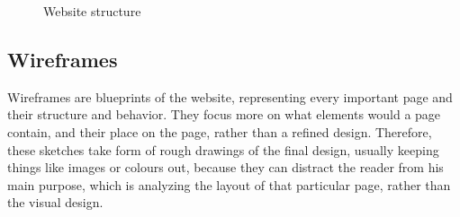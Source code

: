 \documentclass{l3proj}
\begin{document}
\begin{figure}
\begin{center}
		\qquad

	\end{center}
	\label{fig:website-structure}
	\caption{Website structure}
\end{figure}

\subsection{Wireframes}
% 
% 
Wireframes are blueprints of the website, representing every important page and 
their structure and behavior.
They focus more on what elements would a page contain, and their place on
the page, rather than a refined design. Therefore, these sketches take form of
rough drawings of the final design, usually keeping things like images or
colours out, because they can distract the reader from his main purpose, which
is analyzing the layout of that particular page, rather than the visual design.
\end{document}
